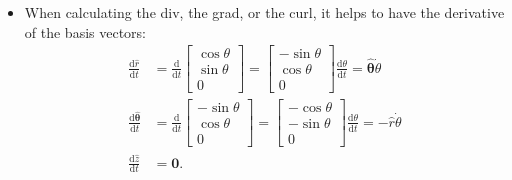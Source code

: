 \documentclass[10pt]{article}
\newcommand{\dee}{\mathrm{d}}
\newcommand{\ve}[1]{\mathbf{#1}}
\begin{document}
\begin{itemize}
    \item When calculating the div, the grad, or the curl, it helps to have the derivative of the basis vectors:
    \begin{align*}
      \frac{\dee \hat{r}}{\dee t}
      &= \frac{\dee}{\dee t} \begin{bmatrix}
        \cos \theta \\ \sin\theta \\ 0
      \end{bmatrix}
      = \begin{bmatrix}
        -\sin \theta \\ \cos\theta \\ 0
      \end{bmatrix}\frac{\dee \theta}{\dee t}
      = \hat{\ve{\theta}} \dot \theta \\
      \frac{\dee \hat{\ve{\theta}}}{\dee t}
      &= \frac{\dee}{\dee t} \begin{bmatrix}
        -\sin \theta \\ \cos\theta \\ 0
      \end{bmatrix}
      = \begin{bmatrix}
        -\cos \theta \\ -\sin\theta \\ 0
      \end{bmatrix}\frac{\dee \theta}{\dee t}
      = -\hat{r} \dot\theta \\
      \frac{\dee \hat{z}}{\dee t} &= \ve{0}.
    \end{align*}    
  \end{itemize}
\end{document}
